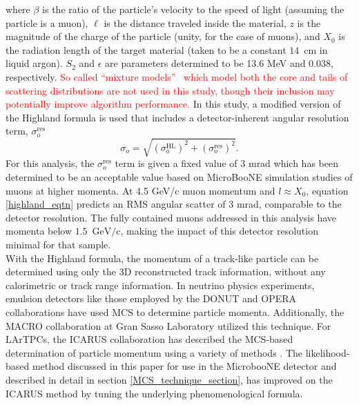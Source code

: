 \documentclass[a4paper,11pt]{article}
\begin{document}
\noindent where $\beta$ is the ratio of the particle's velocity to the speed of light (assuming the particle is a muon), $\ell$ is the distance traveled inside the material, $z$ is the magnitude of the charge of the particle (unity, for the case of muons), and $X_0$ is the radiation length of the target material (taken to be a constant $14$~cm in liquid argon). $S_2$ and $\epsilon$ are parameters determined to be 13.6 MeV and 0.038, respectively. \textcolor{red}{So called ``mixture models''~\cite{mixmodel1,mixmodel2} which model both the core and tails of scattering distributions are not used in this study, though their inclusion may potentially improve algorithm performance.} In this study, a modified version of the Highland formula is used that includes a detector-inherent angular resolution term, $\sigma_o^{\text{res}}$
\begin{equation}\label{modified_highland_eqtn}
\sigma_{o} = \sqrt{ (\sigma_o^{\text{HL}})^2 + (\sigma_o^{\text{res}})^2}.%
\end{equation}
For this analysis, the $\sigma_o^{\text{res}}$ term is given a fixed value of 3 mrad which has been determined to be an acceptable value based on MicroBooNE simulation studies of muons at higher momenta. At 4.5 GeV/c muon momentum and $l\approx X_0$, equation \ref{highland_eqtn} predicts an RMS angular scatter of 3 mrad, comparable to the detector resolution. The fully contained muons addressed in this analysis have momenta below $1.5$~$\text{GeV/c}$, making the impact of this detector resolution minimal for that sample.\\

With the Highland formula, the momentum of a track-like particle can be determined using only the 3D reconstructed track information, without any calorimetric or track range information. In neutrino physics experiments, emulsion detectors like those employed by the DONUT \cite{DONUT_paper} and OPERA \cite{OPERA_paper} collaborations have used MCS to determine particle momenta. Additionally, the MACRO \cite{MACRO_paper} collaboration at Gran Sasso Laboratory utilized this technique. For LArTPCs, the ICARUS collaboration has described the MCS-based determination of particle momentum using a variety of methods \cite{icarus_mcs_paper,new_icarus_paper}. The likelihood-based method discussed in this paper for use in the MicrobooNE detector and described in detail in section \ref{MCS_technique_section}, has improved on the ICARUS method by tuning the underlying phenomenological formula.
\end{document}
